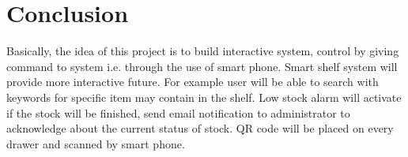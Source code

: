 \documentclass{sigchi}
\begin{document}
\section{Conclusion}
Basically, the idea of this project is to build interactive system,
control by giving command to system i.e. through the use of smart phone. Smart
shelf system will provide more interactive future. For example user will be able to
search with keywords for specific item may contain in the shelf. Low stock alarm
will activate if the stock will be finished, send email notification to administrator to
acknowledge about the current status of stock. QR code will be placed on every
drawer and scanned by smart phone.


%
%
%
%
%
\balance{}

\balance{}



\end{document}
